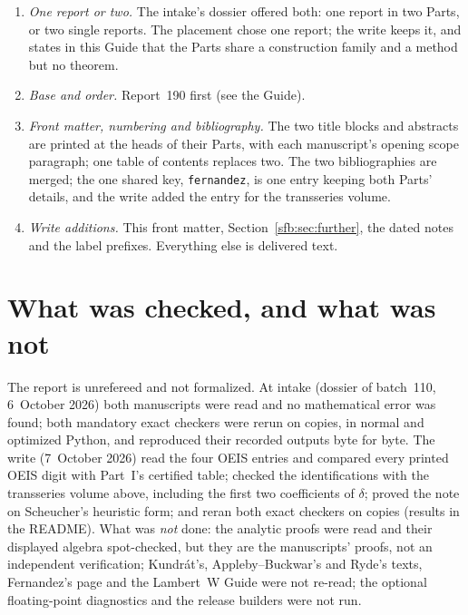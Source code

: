 \documentclass[11pt]{article}
\theoremstyle{remark}\newtheorem{remark}[theorem]{Remark}
\begin{document}
\begin{enumerate}
\item \emph{One report or two.} The intake's dossier offered both: one report
in two Parts, or two single reports. The placement chose one report; the
write keeps it, and states in this Guide that the Parts share a construction
family and a method but no theorem.
\item \emph{Base and order.} Report~190 first (see the Guide).
\item \emph{Front matter, numbering and bibliography.} The two title blocks
and abstracts are printed at the heads of their Parts, with each manuscript's
opening scope paragraph; one table of contents replaces two. The two
bibliographies are merged; the one shared key, \texttt{fernandez}, is one
entry keeping both Parts' details, and the write added the entry for the
transseries volume.
\item \emph{Write additions.} This front matter, Section~\ref{sfb:sec:further},
the dated notes and the label prefixes. Everything else is delivered text.
\end{enumerate}

\section*{What was checked, and what was not}\label{sfb:sec:trust}
The report is unrefereed and not formalized. At intake (dossier of batch~110,
6~October 2026) both manuscripts were read and no mathematical error was
found; both mandatory exact checkers were rerun on copies, in normal and
optimized Python, and reproduced their recorded outputs byte for byte. The
write (7~October 2026) read the four OEIS entries and compared every printed
OEIS digit with Part~I's certified table; checked the identifications with
the transseries volume above, including the first two coefficients of
$\delta$; proved the note on Scheucher's heuristic form; and reran both exact
checkers on copies (results in the README). What was \emph{not} done: the
analytic proofs were read and their displayed algebra spot-checked, but they
are the manuscripts' proofs, not an independent verification; Kundr\'at's,
Appleby--Buckwar's and Ryde's texts, Fernandez's page and the Lambert~W Guide
were not re-read; the optional floating-point diagnostics and the release
builders were not run.
\end{document}
